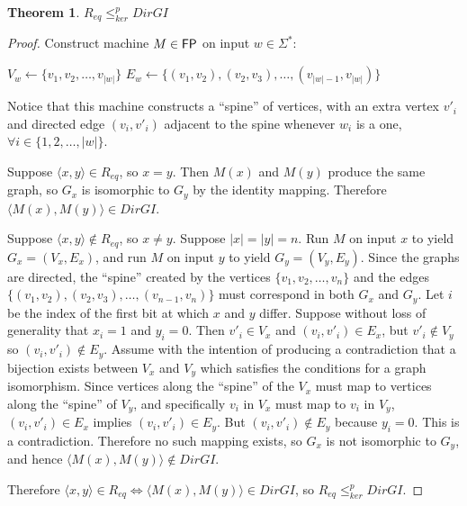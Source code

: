 \documentclass{article}
\newtheorem{theorem}{Theorem}[section]
\theoremstyle{definition} \newtheorem{definition}[definition]{Definition}
\newcommand{\sigmastar}{\Sigma^{*}} %
\newcommand{\kr}{\leq^{p}_{ker}} %
\newcommand{\pair}[2]{\langle#1,#2\rangle} %
\begin{document}
\begin{theorem}\label{thm:req_kr_dirgi}$R_{eq} \kr DirGI$\end{theorem}
\begin{proof}
  Construct machine $M\in{\ensuremath{\mathsf{FP}}}$ on input $w\in\sigmastar$:\\
  \begin{algorithm}[H]
    $V_w\gets\{v_1, v_2, \ldots, v_{|w|}\}$\; 
    $E_w\gets\{(v_1, v_2), (v_2, v_3), \ldots, (v_{|w|-1},
    v_{|w|})\}$\;
  \end{algorithm}
  Notice that this machine constructs a ``spine'' of vertices, with an extra
  vertex $v'_i$ and directed edge $(v_i, v'_i)$ adjacent to the spine whenever
  $w_i$ is a one, $\forall i\in\{1,2,\ldots,|w|\}$.

  Suppose $\pair{x}{y}\in R_{eq}$, so $x=y$. Then $M(x)$ and $M(y)$ produce the
  same graph, so $G_x$ is isomorphic to $G_y$ by the identity
  mapping. Therefore $\pair{M(x)}{M(y)}\in DirGI$.
  

  Suppose $\pair{x}{y}\notin R_{eq}$, so $x\neq y$. Suppose $|x|=|y|=n$. Run
  $M$ on input $x$ to yield $G_x=(V_x, E_x)$, and run $M$ on input $y$ to yield
  $G_y=(V_y, E_y)$. Since the graphs are directed, the ``spine'' created by the
  vertices $\{v_1, v_2, \ldots, v_n\}$ and the edges $\{(v_1, v_2), (v_2, v_3),
  \ldots, (v_{n-1}, v_n)\}$ must correspond in both $G_x$ and $G_y$. Let $i$ be
  the index of the first bit at which $x$ and $y$ differ. Suppose without loss
  of generality that $x_i=1$ and $y_i=0$. Then $v'_i\in V_x$ and $(v_i,
  v'_i)\in E_x$, but $v'_i\notin V_y$ so $(v_i, v'_i)\notin E_y$. Assume with
  the intention of producing a contradiction that a bijection exists between
  $V_x$ and $V_y$ which satisfies the conditions for a graph isomorphism. Since
  vertices along the ``spine'' of the $V_x$ must map to vertices along the
  ``spine'' of $V_y$, and specifically $v_i$ in $V_x$ must map to $v_i$ in
  $V_y$, $(v_i, v'_i)\in E_x$ implies $(v_i, v'_i)\in E_y$. But $(v_i,
  v'_i)\notin E_y$ because $y_i=0$. This is a contradiction. Therefore no such
  mapping exists, so $G_x$ is not isomorphic to $G_y$, and hence
  $\pair{M(x)}{M(y)}\notin DirGI$.

  Therefore $\pair{x}{y}\in R_{eq} \iff \pair{M(x)}{M(y)}\in DirGI$, so
  $R_{eq}\kr DirGI$.
\end{proof}
\end{document}
